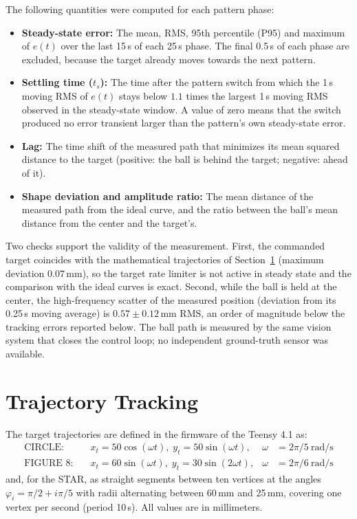The following quantities were computed for each pattern phase:
\begin{itemize}
    \item \textbf{Steady-state error:} The mean, RMS, 95th percentile (P95) and maximum of $e(t)$ over the last 15\,s of each 25\,s phase. The final 0.5\,s of each phase are excluded, because the target already moves towards the next pattern.
    \item \textbf{Settling time ($t_s$):} The time after the pattern switch from which the 1\,s moving RMS of $e(t)$ stays below $1.1$ times the largest 1\,s moving RMS observed in the steady-state window. A value of zero means that the switch produced no error transient larger than the pattern's own steady-state error.
    \item \textbf{Lag:} The time shift of the measured path that minimizes its mean squared distance to the target (positive: the ball is behind the target; negative: ahead of it).
    \item \textbf{Shape deviation and amplitude ratio:} The mean distance of the measured path from the ideal curve, and the ratio between the ball's mean distance from the center and the target's.
\end{itemize}

Two checks support the validity of the measurement. First, the commanded target coincides with the mathematical trajectories of Section~\ref{sec:exp_traj} (maximum deviation $0.07$\,mm), so the target rate limiter is not active in steady state and the comparison with the ideal curves is exact. Second, while the ball is held at the center, the high-frequency scatter of the measured position (deviation from its 0.25\,s moving average) is $0.57 \pm 0.12$\,mm RMS, an order of magnitude below the tracking errors reported below. The ball path is measured by the same vision system that closes the control loop; no independent ground-truth sensor was available.

\section{Trajectory Tracking}
\label{sec:exp_traj}

The target trajectories are defined in the firmware of the Teensy 4.1 as:
\begin{align}
    \text{CIRCLE:}   \quad & x_t = 50\cos(\omega t),\; y_t = 50\sin(\omega t), & \omega &= 2\pi/5\ \text{rad/s} \\
    \text{FIGURE 8:} \quad & x_t = 60\sin(\omega t),\; y_t = 30\sin(2\omega t), & \omega &= 2\pi/6\ \text{rad/s}
\end{align}
and, for the STAR, as straight segments between ten vertices at the angles $\varphi_i = \pi/2 + i\pi/5$ with radii alternating between 60\,mm and 25\,mm, covering one vertex per second (period 10\,s). All values are in millimeters.

